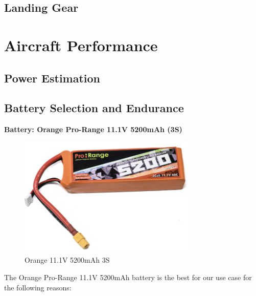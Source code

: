 \documentclass[12pt]{report}
\begin{document}
      \subsection*{Landing Gear}
        
    \section{Aircraft Performance}
      \subsection{Power Estimation}
      \subsection{Battery Selection and Endurance}
      \noindent \textbf{Battery: Orange Pro-Range 11.1V 5200mAh (3S)} \\
      \begin{figure}
        \includegraphics[width=1\linewidth]{battery.png}
        \caption{Orange 11.1V 5200mAh 3S}
        \label{fig:battery3s}
      \end{figure}
     
      The Orange Pro-Range 11.1V 5200mAh battery is the best for our use case for the following reasons: \\
\end{document}
